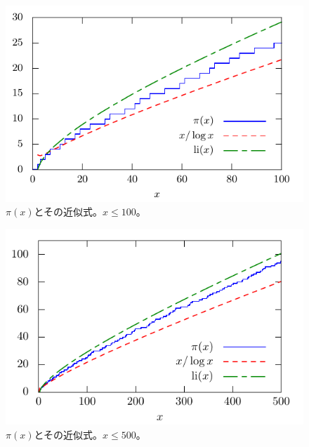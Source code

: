 \documentclass[11pt,b5paper,papersize,dvipdfmx]{jsbook}
\begin{document}
%
\begin{figure}[p]
  \centering
  \includegraphics{nkym/gnuplot/prime-step/100main.pdf}
  \caption{$\pi(x)$とその近似式。$x\le100$。}
  \label{fig:prime-step100}
\end{figure}
%
\begin{figure}[p]
  \centering
  \includegraphics{nkym/gnuplot/prime-step/500main.pdf}
  \caption{$\pi(x)$とその近似式。$x\le500$。}
  \label{fig:prime-step500}
\end{figure}

\clearpage

%
\end{document}
